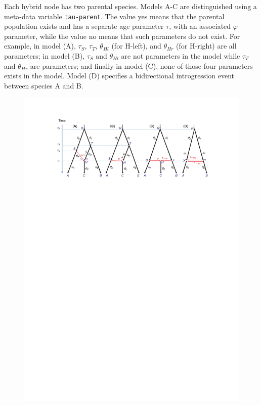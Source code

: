 \documentclass[a4paper]{book}
\numberwithin{equation}{section} \renewcommand{\baselinestretch}{0.55}
\begin{document}
Each hybrid node has two parental species.  Models A-C are
distinguished using a meta-data variable \texttt{tau-parent}.  The
value yes means that the parental population exists and has a separate
age parameter $\tau$, with an associated $\varphi$ parameter, while
the value no means that such parameters do not exist.  For example, in
model (A), $\tau_S$, $\tau_T$, $\theta_{Hl}$ (for H-left), and
$\theta_{Hr}$ (for H-right) are all parameters; in model (B), $\tau_S$
and $\theta_{Hl}$ are not parameters in the model while $\tau_T$ and
$\theta_{Hr}$ are parameters; and finally in model (C), none of those
four parameters exists in the model.  Model (D) specifies a
bidirectional introgression event between species A and B.


\begin{figure} [t]
  \centering \includegraphics[scale=0.7890]{figures/fig-msci-models}


\end{figure}
\end{document}
